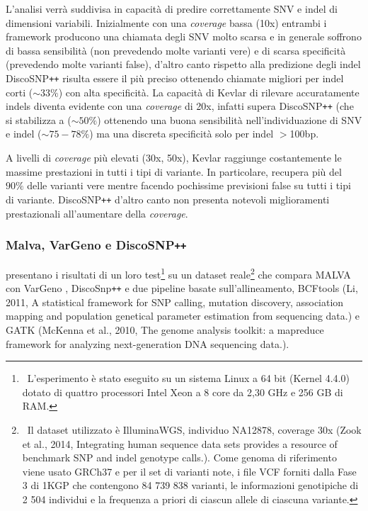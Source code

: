 \documentclass[../main.tex]{subfiles}
\begin{document}
L'analisi verrà suddivisa in capacità di predire correttamente SNV e indel di dimensioni variabili. Inizialmente con una \textit{coverage} bassa (10x) entrambi i framework producono una chiamata degli SNV molto scarsa e in generale soffrono di bassa sensibilità (non prevedendo molte varianti vere) e di scarsa specificità (prevedendo molte varianti false), d'altro canto rispetto alla predizione degli indel DiscoSNP\texttt{++} risulta essere il più preciso ottenendo chiamate migliori per indel corti ($\sim 33\%$) con alta specificità. La capacità di Kevlar di rilevare accuratamente indels diventa evidente con una \textit{coverage} di 20x, infatti supera DiscoSNP\texttt{++} (che si stabilizza a ($\sim 50\%$) ottenendo una buona sensibilità nell'individuazione di SNV e indel ($\sim 75-78\%$) ma una discreta specificità solo per indel $>$100bp. 

A livelli di \textit{coverage} più elevati (30x, 50x), Kevlar raggiunge costantemente le massime prestazioni in tutti i tipi di variante. In particolare, recupera più del $90\%$ delle varianti vere mentre facendo pochissime previsioni false su tutti i tipi di variante. DiscoSNP\texttt{++} d'altro canto non presenta notevoli miglioramenti prestazionali all'aumentare della \textit{coverage}.

\subsubsection{Malva, VarGeno e DiscoSNP\texttt{++}}

\noindent
\cite{bernardini2019malva} presentano i risultati di un loro test\footnote{\ L'esperimento è stato eseguito su un sistema Linux a 64 bit (Kernel 4.4.0) dotato di quattro processori Intel Xeon a 8 core da 2,30 GHz e 256 GB di RAM.} su un dataset reale\footnote{\ Il dataset utilizzato è IlluminaWGS, individuo NA12878, coverage 30x (Zook et al., 2014, Integrating human sequence data sets provides a resource of benchmark SNP and indel genotype calls.). Come genoma di riferimento viene usato GRCh37 e per il set di varianti note, i file VCF forniti dalla Fase 3 di 1KGP che contengono  84 739 838 varianti, le informazioni genotipiche di 2 504 individui e la frequenza a priori di ciascun allele di ciascuna variante.} che compara MALVA con VarGeno \cite{sun-medvedev2018vargeno}, DiscoSnp\texttt{++} \cite{peterlongo2017discosnp++} e due pipeline basate sull'allineamento, BCFtools (Li, 2011, A statistical framework for SNP calling, mutation discovery, association mapping and population genetical parameter estimation from sequencing data.) e GATK (McKenna et al., 2010, The genome analysis toolkit: a mapreduce framework for analyzing next-generation DNA sequencing data.). 
\end{document}

